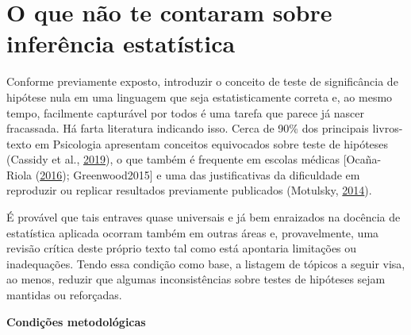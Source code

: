 \documentclass[
]{book}
\begin{document}
\hypertarget{o-que-nuxe3o-te-contaram-sobre-inferuxeancia-estatuxedstica}{%
\section{O que não te contaram sobre inferência
estatística}\label{o-que-nuxe3o-te-contaram-sobre-inferuxeancia-estatuxedstica}}

Conforme previamente exposto, introduzir o conceito de teste de
significância de hipótese nula em uma linguagem que seja
estatisticamente correta e, ao mesmo tempo, facilmente capturável por
todos é uma tarefa que parece já nascer fracassada. Há farta literatura
indicando isso. Cerca de 90\% dos principais livros-texto em Psicologia
apresentam conceitos equivocados sobre teste de hipóteses (Cassidy et
al., \protect\hyperlink{ref-Cassidy2019}{2019}), o que também é
frequente em escolas médicas {[}Ocaña-Riola
(\protect\hyperlink{ref-OcaaRiola2016}{2016}); Greenwood2015{]} e uma
das justificativas da dificuldade em reproduzir ou replicar resultados
previamente publicados (Motulsky,
\protect\hyperlink{ref-Motulsky2014}{2014}).

É provável que tais entraves quase universais e já bem enraizados na
docência de estatística aplicada ocorram também em outras áreas e,
provavelmente, uma revisão crítica deste próprio texto tal como está
apontaria limitações ou inadequações. Tendo essa condição como base, a
listagem de tópicos a seguir visa, ao menos, reduzir que algumas
inconsistências sobre testes de hipóteses sejam mantidas ou reforçadas.

\textbf{Condições metodológicas}
\end{document}
